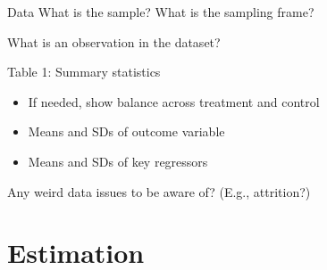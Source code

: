 \documentclass[aspectratio=169, 11pt]{beamer}
\begin{document}
\begin{frame}{Data}
    What is the sample? What is the sampling frame?
    
    What is an observation in the dataset?
    
    Table 1: Summary statistics\\
    \begin{itemize}
        \item If needed, show balance across treatment and control
        \item Means and SDs of outcome variable
        \item Means and SDs of key regressors
    \end{itemize}
    
    Any weird data issues to be aware of? (E.g., attrition?)
\end{frame}

\section{Estimation}
\end{document}
